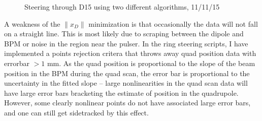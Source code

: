 \begin{figure}[htb]
\centering
{}
\hspace{.05in}
\hspace{.25in}
\raggedleft
{}

\caption{Steering through D15 using two different algorithms, 11/11/15}
\label{fig:injection_steering}
\end{figure}


A weakness of the  $\| x_D \|$ minimization is that occasionally the data will not fall on a straight line. This is most likely due to scraping between the dipole and BPM or noise in the region near the pulser. In the ring steering scripts, I have implemented a points rejection critera that throws away quad position data with errorbar $> 1$ mm. As the quad position is proportional to the slope of the beam position in the BPM during the quad scan, the error bar is proportional to the uncertainty in the fitted slope -- large nonlinearities in the quad scan data will have large error bars bracketing the estimate of position in the quadrupole. However, some clearly nonlinear points do not have associated large error bars, and one can still get sidetracked by this effect.

